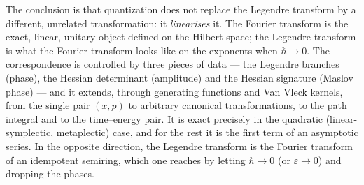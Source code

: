 \documentclass[11pt,a4paper]{article}
\newcommand{\hb}{\hbar}
\theoremstyle{plain}
\theoremstyle{definition}
\theoremstyle{remark}
\begin{document}
The conclusion is that quantization does not replace the Legendre transform by a different, unrelated transformation: it \emph{linearises} it. The Fourier transform is the exact, linear, unitary object defined on the Hilbert space; the Legendre transform is what the Fourier transform looks like on the exponents when $\hb\to0$. The correspondence is controlled by three pieces of data --- the Legendre branches (phase), the Hessian determinant (amplitude) and the Hessian signature (Maslov phase) --- and it extends, through generating functions and Van Vleck kernels, from the single pair $(x,p)$ to arbitrary canonical transformations, to the path integral and to the time--energy pair. It is exact precisely in the quadratic (linear-symplectic, metaplectic) case, and for the rest it is the first term of an asymptotic series. In the opposite direction, the Legendre transform is the Fourier transform of an idempotent semiring, which one reaches by letting $\hb\to0$ (or $\varepsilon\to0$) and dropping the phases.
\end{document}
